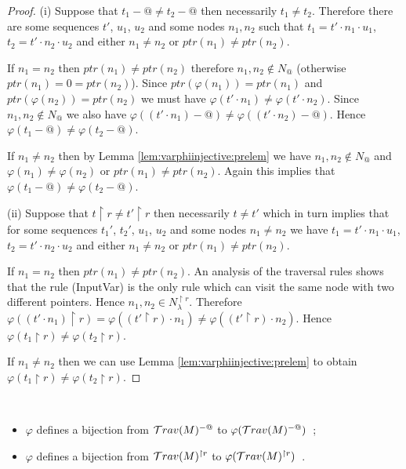 \begin{proof}
(i) Suppose that $t_1-@\neq t_2-@$ then necessarily $t_1 \neq t_2$. Therefore there are some sequences $t'$, $u_1$, $u_2$ and some nodes $n_1,n_2$ such that
 $t_1 = t' \cdot n_1 \cdot u_1$, $t_2 = t' \cdot n_2 \cdot u_2$ and either $n_1\neq n_2$ or $ptr(n_1) \neq ptr(n_2)$.

If $n_1 = n_2$ then $ptr(n_1) \neq ptr(n_2)$ therefore $n_1,n_2 \not\in N_@$ (otherwise $ptr(n_1) = 0 = ptr(n_2)$). Since $ptr(\varphi(n_1)) = ptr(n_1)$ and  $ptr(\varphi(n_2)) = ptr(n_2)$ we must have $\varphi(t' \cdot n_1) \neq \varphi(t' \cdot n_2)$. Since $n_1,n_2 \not\in N_@$ we also have $\varphi((t' \cdot n_1)-@) \neq \varphi((t' \cdot n_2)-@)$. Hence $\varphi(t_1-@) \neq \varphi(t_2-@)$.

If $n_1 \neq n_2$ then by Lemma \ref{lem:varphiinjective:prelem} we have $n_1,n_2 \not\in N_@$ and $\varphi(n_1) \neq \varphi(n_2)$ or $ptr(n_1) \neq ptr(n_2)$.
Again this implies that $\varphi(t_1-@) \neq \varphi(t_2-@)$.


(ii) Suppose that $t \upharpoonright r \neq t' \upharpoonright r$ then necessarily $t \neq t'$ which in turn implies that for some sequences $t_1'$, $t_2'$, $u_1$, $u_2$ and some nodes $n_1 \neq n_2$
we have $t_1 = t' \cdot n_1 \cdot u_1$, $t_2 = t' \cdot n_2 \cdot u_2$ and either $n_1\neq n_2$ or $ptr(n_1) \neq ptr(n_2)$.

If $n_1 = n_2$ then $ptr(n_1) \neq ptr(n_2)$. An   analysis of the traversal rules shows that the rule (InputVar) is the only rule which can visit the same node with two different pointers. Hence $n_1,n_2 \in N_\lambda^{\upharpoonright r}$.
Therefore $\varphi( (t'\cdot n_1) \upharpoonright r ) = \varphi( (t'\upharpoonright r) \cdot n_1 )  \neq \varphi( (t'\upharpoonright r) \cdot n_2 )$. Hence    $\varphi( t_1\upharpoonright r ) \neq \varphi( t_2\upharpoonright r )$.

If $n_1 \neq n_2$ then we can use Lemma \ref{lem:varphiinjective:prelem}
to obtain $\varphi( t_1\upharpoonright r ) \neq \varphi( t_2\upharpoonright r )$.
\end{proof}

\begin{cor} \
\label{cor:varphi_bij}
\begin{itemize}
\item[(i)] $\varphi$ defines a bijection from $\mathcal{T}rav(M)^{-@}$
to $\varphi(\mathcal{T}rav(M)^{-@})$\ ;
\item[(ii)] $\varphi$ defines a bijection from $\mathcal{T}rav(M)^{\upharpoonright r}$ to
$\varphi(\mathcal{T}rav(M)^{\upharpoonright r})$\ .
\end{itemize}
\end{cor}

